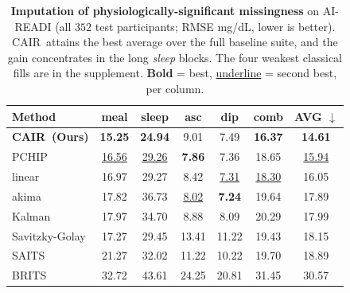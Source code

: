 \begin{table}[t]
  \centering
  {\small
  \setlength{\tabcolsep}{3.2pt}
  \begin{tabular}{lcccccc}
    \toprule
    Method & meal & sleep & asc & dip & comb & \textbf{AVG} $\downarrow$ \\
    \midrule
    \textbf{CAIR\ (Ours)} & \textbf{15.25} & \textbf{24.94} & 9.01 & 7.49 & \textbf{16.37} & \textbf{14.61} \\
    \midrule
    PCHIP           & \underline{16.56} & \underline{29.26} & \textbf{7.86} & 7.36 & 18.65 & \underline{15.94} \\
    linear          & 16.97 & 29.27 & 8.42 & \underline{7.31} & \underline{18.30} & 16.05 \\
    akima           & 17.82 & 36.73 & \underline{8.02} & \textbf{7.24} & 19.64 & 17.89 \\
    Kalman          & 17.97 & 34.70 & 8.88 & 8.09 & 20.29 & 17.99 \\
    Savitzky-Golay & 17.27 & 29.45 & 13.41 & 11.22 & 19.43 & 18.15 \\
    SAITS           & 21.27 & 32.02 & 11.22 & 10.22 & 19.70 & 18.89 \\
    BRITS           & 32.72 & 43.61 & 24.25 & 20.81 & 31.45 & 30.57 \\
    \bottomrule
  \end{tabular}}
  \caption{\textbf{Imputation of physiologically-significant missingness} on AI-READI (all $352$
  test participants; RMSE mg/dL, lower is better). CAIR\ attains the best
  average over the full baseline suite, and the gain concentrates in the long
  \emph{sleep} blocks. The four weakest classical fills are in the supplement.
  \textbf{Bold} = best, \underline{underline} = second
  best, per column.}
  \label{tab:phys}
\end{table}

